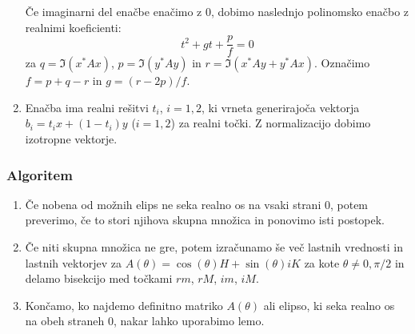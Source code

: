 \documentclass{beamer}
\newcounter{saveenumi}
\newcommand{\seti}{\setcounter{saveenumi}{\value{enumi}}}
\newcommand{\conti}{\setcounter{enumi}{\value{saveenumi}}}
\begin{document}
\begin{frame}
\begin{enumerate}[1.]
Če imaginarni del enačbe enačimo z 0, dobimo naslednjo polinomsko enačbo z realnimi koeficienti:
\begin{equation*}
t^2+gt+\frac{p}{f}=0 
\end{equation*}
za $q=\Im(x^\ast Ax)$, $p=\Im(y^\ast Ay)$ in $r=\Im(x^\ast  Ay + y^\ast Ax)$. Označimo $f=p+q-r$ in $g=(r-2p)/f$.\medskip
\item  Enačba ima realni rešitvi $t_i$, $i=1,2$, ki vrneta generirajoča vektorja $b_i=t_ix+(1-t_i)y$ ($i=1,2$) za realni točki. Z normalizacijo dobimo izotropne vektorje. %
\seti
\end{enumerate}
\end{frame}\begin{frame}
\frametitle{Algoritem}
\begin{enumerate}[1.]
\conti
\item Če nobena od možnih elips ne seka realno os na vsaki strani 0, potem preverimo, če to stori njihova skupna množica in ponovimo isti postopek.\medskip
\item Če niti skupna množica ne gre, potem izračunamo še več lastnih vrednosti in lastnih vektorjev za $A(\theta)=\cos(\theta)H+\sin(\theta)iK$ za kote $\theta \not =0,\pi/2$ in delamo bisekcijo med točkami $rm$, $rM$, $im$, $iM$.\medskip
\item Končamo, ko najdemo definitno matriko $A(\theta)$ ali elipso, ki seka realno os na obeh straneh 0, nakar lahko uporabimo lemo.
\end{enumerate}
\end{frame}
\end{document}
